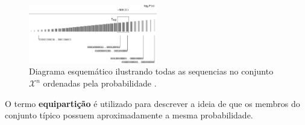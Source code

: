 \begin{frame}[allowframebreaks]
  \framebreak
  \begin{figure}[h!]
  \centering
  \includegraphics[width=0.5\textwidth]{images/seq100mackay3.pdf}
  \caption{Diagrama esquemático ilustrando todas as sequencias no conjunto $\mathcal{X}^n$ ordenadas pela probabilidade \cite{mackay2003}.}
  \label{fig:seq100mackay3}
  \end{figure}


  O termo \textbf{equipartição} é utilizado para descrever a ideia de que os membros do conjunto típico
  possuem aproximadamente a mesma probabilidade.

  
\end{frame}

